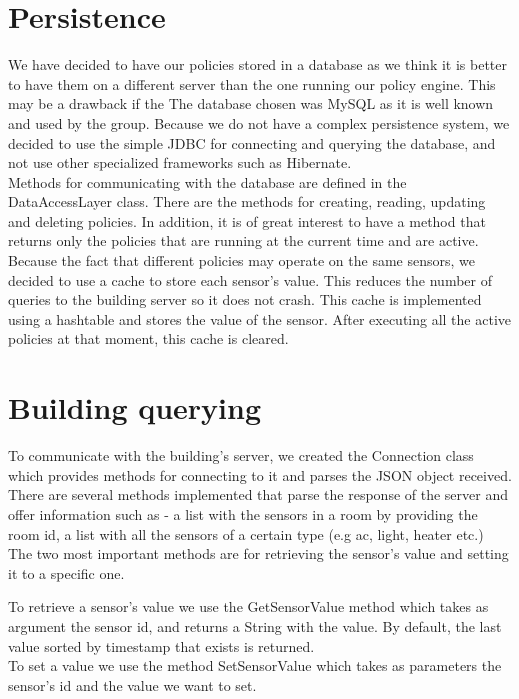 \section{Persistence}
We have decided to have our policies stored in a database as we think it is better to have them on a different server than the one running our policy engine. This may be a drawback if the The database chosen was MySQL as it is well known and used by the group. Because we do not have a complex persistence system, we decided to use the simple JDBC for connecting and querying the database, and not use other specialized frameworks such as Hibernate. 
\\Methods for communicating with the database are defined in the DataAccessLayer class. There are the methods for creating, reading, updating and deleting policies. In addition, it is of great interest to have a method that returns only the policies that are running at the current time and are active. 
\\Because the fact that different policies may operate on the same sensors, we decided to use a cache to store each sensor's value. This reduces the number of queries to the building server so it does not crash. This cache is implemented using a hashtable and stores the value of the sensor. After executing all the active policies at that moment, this cache is cleared. 
\section{Building querying}
To communicate with the building's server, we created the Connection class which provides methods for connecting to it and parses the JSON object received. There are several methods implemented that parse the response of the server and offer information such as - a list with the sensors in a room by providing the room id, a list with all the sensors of a certain type (e.g ac, light, heater etc.) The two most important methods are for retrieving the sensor's value and setting it to a specific one. 

To retrieve a sensor's value we use the GetSensorValue method which takes as argument the sensor id, and returns a String with the value. By default, the last value sorted by timestamp that exists is returned.  
\\ To set a value we use the method SetSensorValue which takes as parameters the sensor's id and the value we want to set. 
